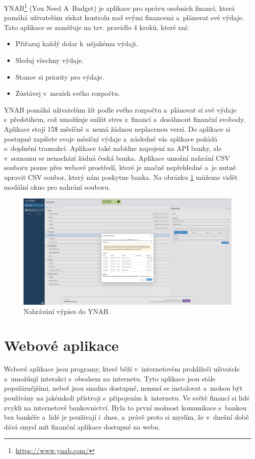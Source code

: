 YNAB\footnote{\url{https://www.ynab.com/}} (You Need A~Budget) je aplikace pro správu osobních financí, která pomáhá uživatelům získat kontrolu nad svými financemi a~plánovat své výdaje. Tato aplikace se zaměřuje na tzv. pravidlo 4 kroků, které zní:
\begin{itemize}
    \item Přiřazuj každý dolar k~nějakému výdaji.
    \item Sleduj všechny výdaje.
    \item Stanov si priority pro výdaje.
    \item Zůstávej v~mezích svého rozpočtu.
\end{itemize}
YNAB pomáhá uživatelům žít podle svého rozpočtu a~plánovat si své výdaje s~předstihem, což umožňuje snížit stres z~financí a~dosáhnout finanční svobody.
Aplikace stojí 15\$ měsíčně a~nemá žádnou neplacenou verzi. Do aplikace si postupně zapíšete svoje měsíční výdaje a~následně vás aplikace požádá o~doplnění transakcí. Aplikace také nabídne napojení na API banky, ale v~seznamu se nenachází žádná česká banka. Aplikace umožní nahrání CSV souboru pouze přes webové prostředí, které je značně nepřehledné a~je nutné upravit CSV soubor, který nám poskytne banka. Na obrázku \ref{fig:ynab} můžeme vidět modální okno pro nahrání souboru.
\begin{figure}[ht]
    \centering
    \includegraphics[width=\textwidth]{obrazky-figures/ynab.png}
    \caption{Nahrávání výpisu do YNAB.}
    \label{fig:ynab}
\end{figure}
\section{Webové aplikace}

Webové aplikace jsou programy, které běží v~internetovém prohlížeči uživatele a~umožňují interakci s~obsahem na internetu. Tyto aplikace jsou stále populárnějšími, neboť jsou snadno dostupné, nemusí se instalovat a~mohou být používány na jakémkoli přístroji s~připojením k~internetu. Ve světě financí si lidé zvykli na internetové bankovnictví. Byla to první možnost komunikace s~bankou bez bankéře a~lidé je používají i~dnes, a~právě proto si myslím, že v~dnešní době dává smysl mít finanční aplikace dostupné na webu.

